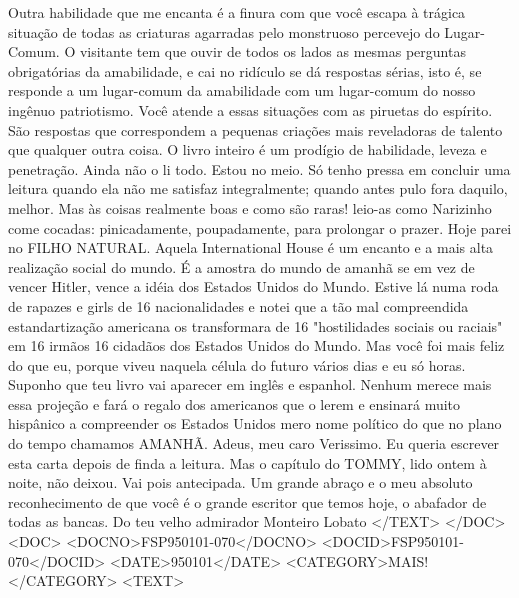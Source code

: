 Outra habilidade que me encanta é a finura com que você escapa à trágica situação de todas as criaturas agarradas pelo monstruoso percevejo do Lugar-Comum. O visitante tem que ouvir de todos os lados as mesmas perguntas obrigatórias da amabilidade, e cai no ridículo se dá respostas sérias, isto é, se responde a um lugar-comum da amabilidade com um lugar-comum do nosso ingênuo patriotismo. Você atende a essas situações com as piruetas do espírito. São respostas que correspondem a pequenas criações mais reveladoras de talento que qualquer outra coisa.
O livro inteiro é um prodígio de habilidade, leveza e penetração. Ainda não o li todo. Estou no meio. Só tenho pressa em concluir uma leitura quando ela não me satisfaz integralmente; quando antes pulo fora daquilo, melhor. Mas às coisas realmente boas e como são raras! leio-as como Narizinho come cocadas: pinicadamente, poupadamente, para prolongar o prazer. Hoje parei no FILHO NATURAL.
Aquela International House é um encanto e a mais alta realização social do mundo. É a amostra do mundo de amanhã se em vez de vencer Hitler, vence a idéia dos Estados Unidos do Mundo. Estive lá numa roda de rapazes e girls de 16 nacionalidades e notei que a tão mal compreendida estandartização americana os transformara de 16 "hostilidades sociais ou raciais" em 16 irmãos 16 cidadãos dos Estados Unidos do Mundo. Mas você foi mais feliz do que eu, porque viveu naquela célula do futuro vários dias e eu só horas.
Suponho que teu livro vai aparecer em inglês e espanhol. Nenhum merece mais essa projeção e fará o regalo dos americanos que o lerem e ensinará muito hispânico a compreender os Estados Unidos mero nome político do que no plano do tempo chamamos AMANHÃ.
Adeus, meu caro Verissimo. Eu queria escrever esta carta depois de finda a leitura. Mas o capítulo do TOMMY, lido ontem à noite, não deixou. Vai pois antecipada.
Um grande abraço e o meu absoluto reconhecimento de que você é o grande escritor que temos hoje, o abafador de todas as bancas.
Do teu velho admirador
Monteiro Lobato
</TEXT>
</DOC>
<DOC>
<DOCNO>FSP950101-070</DOCNO>
<DOCID>FSP950101-070</DOCID>
<DATE>950101</DATE>
<CATEGORY>MAIS!</CATEGORY>
<TEXT>

